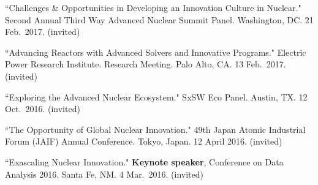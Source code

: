 \begin{bibsection}

\item ``Challenges \& Opportunities in Developing an Innovation Culture in Nuclear." Second Annual Third Way Advanced Nuclear Summit Panel. Washington, DC. 21 Feb.\ 2017. (invited)

\item ``Advancing Reactors with Advanced Solvers and Innovative Programs." Electric Power Research Institute. Research Meeting. Palo Alto, CA. 13 Feb.\ 2017. (invited)

\item ``Exploring the Advanced Nuclear Ecosystem." SxSW Eco Panel. Austin, TX. 12 Oct.\ 2016. (invited)






\item ``The Opportunity of Global Nuclear Innovation." 49th Japan Atomic Industrial Forum (JAIF) Annual Conference. Tokyo, Japan. 12 April 2016. (invited)

\item ``Exascaling Nuclear Innovation." \textbf{Keynote speaker}, Conference on Data Analysis 2016. Santa Fe, NM. 4 Mar.\ 2016. (invited) 



\end{bibsection}
